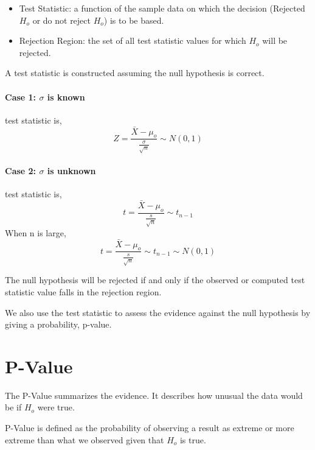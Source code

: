 \documentclass{article}
\begin{document}
    \begin{itemize}
        \item Test Statistic: a function of the sample data on which the decision
        (Rejected $H_{o}$ or do not reject $H_{o}$) is to be based.
        \item Rejection Region: the set of all test statistic values for which $H_{o}$ will be rejected.
    \end{itemize}

    A test statistic is constructed assuming the null hypothesis is correct.

    \paragraph*{Case 1: $\sigma$ is known}
    test statistic is,
    \begin{equation*}
        Z = \frac{\bar{X} - \mu_{o}}{\frac{\sigma}{\sqrt{n}}} \sim N(0, 1)
    \end{equation*}

    \paragraph*{Case 2: $\sigma$ is unknown}
    test statistic is,
    \begin{equation*}
        t = \frac{\bar{X} - \mu_{o}}{\frac{s}{\sqrt{n}}} \sim t_{n-1}
    \end{equation*}
    When n is large,
    \begin{equation*}
        t = \frac{\bar{X} - \mu_{o}}{\frac{s}{\sqrt{n}}} \sim t_{n-1} \sim N(0,1)
    \end{equation*}

    The null hypothesis will be rejected if and 
    only if the observed or computed test statistic value falls in the rejection region.\par

    We also use the test statistic to assess the evidence against the 
    null hypothesis by giving a probability, p-value.

    \section*{P-Value}
    The P-Value summarizes the evidence. It describes how unusual the 
    data would be if $H_{o}$ were true.\par
    
    P-Value is defined as the probability of observing a result as extreme 
    or more extreme than what we observed given that $H_{o}$ is true.
\end{document}
